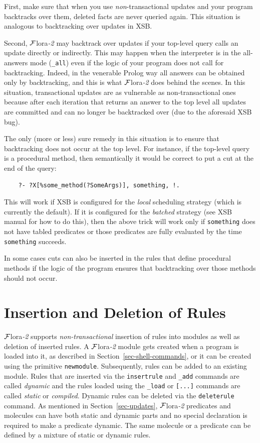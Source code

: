 \documentclass[11pt]{article}
\newcommand{\FLORA}{{\mbox{\sc ${\cal F}${lora}\rm\emph{-2}}}\xspace}
\begin{document}
First, make sure that when you use \emph{non}-transactional updates and
your program backtracks over them, deleted facts are never queried again.
This situation is analogous to backtracking over updates in XSB.

Second, \FLORA may backtrack over updates if your top-level query calls an
update directly or indirectly. This may happen when the interpreter is in
the all-answers mode ({\tt \_all}) even if the logic of your program does
not call for backtracking. Indeed, in the venerable Prolog way all answers
can be obtained only by backtracking, and this is what \FLORA does behind
the scenes. In this situation, transactional updates are as vulnerable as
non-transactional ones because after each iteration that returns an answer
to the top level all updates are committed and can no longer be backtracked
over (due to the aforesaid XSB bug).

The only (more or less) sure remedy in this situation is to ensure that
backtracking does not occur at the top level. For instance, if the
top-level query is a procedural method, then semantically it would be
correct to put a cut at the end of the query:
\begin{verbatim}
    ?- ?X[%some_method(?SomeArgs)], something, !.
\end{verbatim}
This will work if XSB is configured for the \emph{local} scheduling
strategy (which is currently the default). If it is configured for
the \emph{batched} strategy (see XSB manual for how to do this), then the
above trick will work only if {\tt something} does not have tabled
predicates or those predicates are fully evaluated by the time {\tt
  something} succeeds.

In some cases cuts can also be inserted in the rules that define procedural
methods if the logic of the program ensures that backtracking over those
methods should not occur. 


\section{Insertion and Deletion of Rules}

\FLORA supports \emph{non-transactional} insertion of rules into modules as
well as deletion of inserted rules.  A \FLORA module gets created when a
program is loaded into it, as described in
Section~\ref{sec-shell-commands}, or it can be created using the primitive
{\tt newmodule}. Subsequently, rules can be added to an existing module.
Rules that are inserted via the {\tt insertrule} and {\tt \_add} commands
are called \emph{dynamic} and the rules loaded using the {\tt \_load} or
{\tt [...]} commands are called \emph{static} or \emph{compiled}.  Dynamic
rules can be deleted via the {\tt deleterule} command. As mentioned in
Section~\ref{sec-updates}, \FLORA predicates and molecules can have both
static and dynamic parts and no special declaration is required to make a
predicate dynamic. The same molecule or a predicate can be defined by a
mixture of static or dynamic rules.
\end{document}
